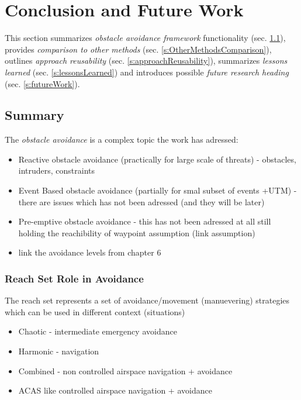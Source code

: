 \cleardoublepage
\chapter{Conclusion and Future Work}\label{ch:Conclusion}
\noindent This section summarizes \emph{obstacle avoidance framework} functionality (sec. \ref{s:conclusionSummary}), provides \emph{comparison to other methods} (sec. \ref{s:OtherMethodsComparison}), outlines \emph{approach reusability} (sec. \ref{s:approachReusability}), summarizes \emph{lessons learned} (sec. \ref{s:lessonsLearned}) and introduces possible \emph{future research heading} (sec. \ref{s:futureWork}).

\section{Summary}\label{s:conclusionSummary}
\noindent The \emph{obstacle avoidance} is a complex topic the work has adressed:
\begin{itemize}
    \item Reactive obstacle avoidance (practically for large scale of threats) - obstacles, intruders, constraints
    
    \item Event Based obstacle avoidance (partially for smal subset of events +UTM) - there are issues which has not been adressed (and they will be later)
    
    \item Pre-emptive obstacle avoidance - this has not been adressed at all still holding the reachibility of waypoint assumption (link assumption) 
    \item link the avoidance levels from chapter 6
\end{itemize}

    
\subsection{Reach Set Role in Avoidance}\label{s:conclusionReachSet}

\noindent The reach set represents a set of avoidance/movement (manuevering) strategies which can be used in different context (situations)
\begin{itemize}
    \item Chaotic - intermediate emergency avoidance
    \item Harmonic - navigation
    \item Combined - non controlled airspace navigation + avoidance
    \item ACAS like  controlled airspace navigation + avoidance
\end{itemize}


